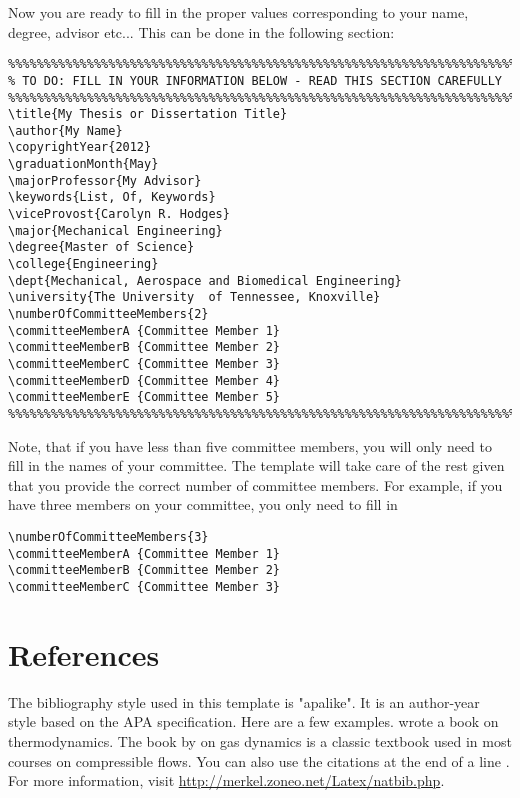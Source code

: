 Now you are ready to fill in the proper values corresponding to your name, degree, advisor etc... This can be done in the following section:
\begin{verbatim}
%%%%%%%%%%%%%%%%%%%%%%%%%%%%%%%%%%%%%%%%%%%%%%%%%%%%%%%%%%%%%%%%%%%%%%%%%%%
% TO DO: FILL IN YOUR INFORMATION BELOW - READ THIS SECTION CAREFULLY
%%%%%%%%%%%%%%%%%%%%%%%%%%%%%%%%%%%%%%%%%%%%%%%%%%%%%%%%%%%%%%%%%%%%%%%%%%%
\title{My Thesis or Dissertation Title}
\author{My Name}
\copyrightYear{2012}
\graduationMonth{May}
\majorProfessor{My Advisor}
\keywords{List, Of, Keywords}
\viceProvost{Carolyn R. Hodges}
\major{Mechanical Engineering}
\degree{Master of Science}
\college{Engineering}
\dept{Mechanical, Aerospace and Biomedical Engineering}
\university{The University  of Tennessee, Knoxville}
\numberOfCommitteeMembers{2}
\committeeMemberA {Committee Member 1}
\committeeMemberB {Committee Member 2}
\committeeMemberC {Committee Member 3}
\committeeMemberD {Committee Member 4}
\committeeMemberE {Committee Member 5}
%%%%%%%%%%%%%%%%%%%%%%%%%%%%%%%%%%%%%%%%%%%%%%%%%%%%%%%%%%%%%%%%%%%%%%%%%%%
\end{verbatim}
Note, that if you have less than five committee members, you will only need to fill in the names of your committee. The template will take care of the rest given that you provide the correct number of committee members. For example, if you have three members on your committee, you only need to fill in
\begin{verbatim}
\numberOfCommitteeMembers{3}
\committeeMemberA {Committee Member 1}
\committeeMemberB {Committee Member 2}
\committeeMemberC {Committee Member 3}
\end{verbatim}

\section{References}
The bibliography style used in this template is "apalike". It is an author-year style based on the APA specification. Here are a few examples. \cite{Fermi1956} wrote a book on thermodynamics. The book by \cite{liepmann2001} on gas dynamics is a classic textbook used in most courses on compressible flows. You can also use the citations at the end of a line \citep{Saad2010RSPA,Lamb1895}. For more information, visit \href{http://merkel.zoneo.net/Latex/natbib.php}{http://merkel.zoneo.net/Latex/natbib.php}.


